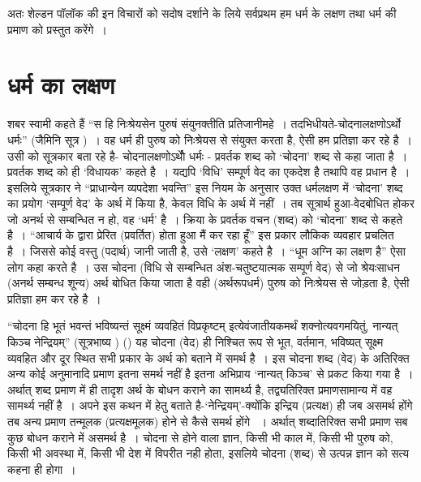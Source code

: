 अतः शेल्डन पॉलॉक की इन विचारों को सदोष दर्शाने के लिये सर्वप्रथम हम धर्म के लक्षण तथा धर्म की प्रमाण को प्रस्तुत करेंगे~।\\[-1cm]

\section*{धर्म का लक्षण}

शबर स्वामी कहते हैं “स हि निःश्रेयसेन पुरुषं संयुनक्तीति प्रतिजानीमहे~। तदभिधीयते-चोदनालक्षणोऽर्थो धर्मः” (जैमिनि सूत्र )~। वह धर्म ही पुरुष को निःश्रेयस से संयुक्त करता है, ऐसी हम प्रतिज्ञा कर रहे है~। उसी को सूत्रकार बता रहे है- चोदनालक्षणोऽर्थोे धर्मः - प्रवर्तक शब्द को ‘चोदना' शब्द से कहा जाता है~। प्रवर्तक शब्द को ही ‘विधायक' कहते है~। यद्यपि ‘विधि' सम्पूर्ण वेद का एकदेश है तथापि वह प्रधान है~। इसलिये सूत्रकार ने “प्राधान्येन व्यपदेशा भवन्ति” इस नियम के अनुसार उक्त धर्मलक्षण में ‘चोदना' शब्द का प्रयोग ‘सम्पूर्ण वेद' के अर्थ में किया है, केवल विधि के अर्थ में नहीं~। तब सूत्रार्थ हुआ-वेदबोधित होकर जो अनर्थ से सम्बन्धित न हो, वह ‘धर्म' है~। क्रिया के प्रवर्तक वचन (शब्द) को ‘चोदना' शब्द से कहते है~। “आचार्य के द्वारा प्रेरित (प्रवर्तित) होता हुआ मैं कर रहा हूँ” इस प्रकार लौकिक व्यवहार प्रचलित है~। जिससे कोई वस्तु (पदार्थ) जानी जाती है, उसे ‘लक्षण' कहते है~। “धूम अग्नि का लक्षण है” ऐसा लोग कहा करते है~। उस चोदना (विधि से सम्बन्धित अंश-चतुष्टयात्मक सम्पूर्ण वेद) से जो श्रेयःसाधन (अनर्थ सम्बन्ध शून्य) अर्थ बोधित किया जाता है वही (अर्थरूपधर्म) पुरुष को निःश्रेयस से जोड़ता है, ऐसी प्रतिज्ञा हम कर रहे है~।

“चोदना हि भूतं भवन्तं भविष्यन्तं सूक्ष्मं व्यवहितं विप्रकृष्टम् इत्येवंजातीयकमर्थं शक्नोत्य\-वगमयितुं, नान्यत् किञ्च नेन्द्रियम्” (सूत्रभाष्य ) () यह चोदना (वेद) ही निश्चित रूप से भूत, वर्तमान, भविष्यत् सूक्ष्म व्यवहित और दूर स्थित सभी प्रकार के अर्थ को बताने में समर्थ है~। इस चोदना शब्द (वेद) के अतिरिक्त अन्य कोई अनुमानादि प्रमाण इतना समर्थ नहीं है इतना अभिप्राय ‘नान्यत् किञ्च' से प्रकट किया गया है~। अर्थात् शब्द प्रमाण में ही तादृश अर्थ के बोधन कराने का सामर्थ्य है, तद्व्यतिरिक्त प्रमाणसामान्य में वह सामर्थ्य नहीं है~। अपने इस कथन में हेतु बताते है-‘नेन्द्रियम्'-क्योंकि इन्द्रिय (प्रत्यक्ष) ही जब असमर्थ होंगे तब अन्य प्रमाण तन्मूलक (प्रत्यक्षमूलक) होने से कैसे समर्थ होंगे ~। अर्थात् शब्दातिरिक्त सभी प्रमाण सब कुछ बोधन कराने में असमर्थ है~। चोदना से होने वाला ज्ञान, किसी भी काल में, किसी भी पुरुष को, किसी भी अवस्था में, किसी भी देश में विपरीत नही होता, इसलिये चोदना (शब्द) से उत्पन्न ज्ञान को सत्य कहना ही होगा~। 

